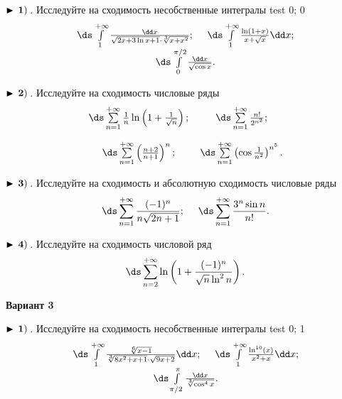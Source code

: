 $\bf\blacktriangleright\,1)\,$. Исследуйте на сходимость несобственные интегралы test 0; 0
\begin{equation*}
\begin{array}{cc}
  \,\ds\int\limits_{1}^{+\infty} \frac{\dd x}{\sqrt{2x+3\ln x +1}\cdot\sqrt[3]{x+x^2}}

  ;\quad\,    \,
\ds\int\limits_{1}^{+\infty}\frac{\ln(1+x)}{x+\sqrt{x}}\dd x

  ;\\
  \,
\ds\int\limits_{0}^{\pi/2}\frac{\dd x}{\sqrt{\cos x}}

  .
\end{array}
\end{equation*}


$\bf\blacktriangleright\,2)\,$. Исследуйте на сходимость числовые ряды
\begin{equation*}
    \begin{array}{ccc}
        \,
\ds\sum\limits_{n=1}^{+\infty}\frac{1}{n}\ln\left(1+\frac{1}{\sqrt{n}}\right)

        ; &   \,
\ds\sum\limits_{n=1}^{+\infty}\frac{n!}{2^{n^2}}

        ; \\[6mm]
        \,
\ds\sum\limits_{n=1}^{+\infty}\left(\frac{n+2}{n+1}\right)^{n}

        ; &    \,
\ds\sum\limits_{n=1}^{+\infty}\left(\cos\frac{1}{n^2}\right)^{n^5}

        .
    \end{array}
\end{equation*}


$\bf\blacktriangleright\,3)\,$. Исследуйте на сходимость и абсолютную сходимость числовые ряды
\begin{equation*}
    \,
\ds\sum\limits_{n=1}^{+\infty}\frac{(-1)^n}{n\sqrt{2n+1}}

    ;\quad\,   \,
\ds\sum\limits_{n=1}^{+\infty}\frac{3^n\sin n}{n!}

    .
\end{equation*}


$\bf\blacktriangleright\,4)\,$. Исследуйте на сходимость числовой ряд
\begin{equation*}
    \,
\ds\sum\limits_{n=2}^{+\infty}\ln\left(1+\frac{(-1)^n}{\sqrt{n}\ln^2 n}\right)

    .
\end{equation*}

\centerline{\bf\Large Вариант 3}


$\bf\blacktriangleright\,1)\,$. Исследуйте на сходимость несобственные интегралы test 0; 1
\begin{equation*}
\begin{array}{cc}
  \,
\ds\int\limits_{1}^{+\infty} \frac{\sqrt[6]{x-1}}{\sqrt[3]{8x^2+x+1}\cdot \sqrt{9x+2}}\dd x

  ;\quad\,    \,
\ds\int\limits_{1}^{+\infty} \frac{\ln^{10}(x)}{x^2+x}\dd x

  ;\\
  \,
\ds\int\limits_{\pi/2}^{\pi}\frac{\dd x}{\sqrt[3]{\cos^4 x}}

  .
\end{array}
\end{equation*}


